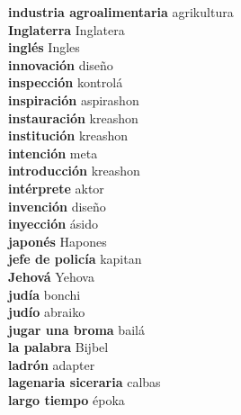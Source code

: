 \textbf{ industria agroalimentaria  } agrikultura \\
\textbf{ Inglaterra  } Inglatera \\
\textbf{ inglés  } Ingles \\
\textbf{ innovación  } diseño \\
\textbf{ inspección  } kontrolá \\
\textbf{ inspiración  } aspirashon \\
\textbf{ instauración  } kreashon \\
\textbf{ institución  } kreashon \\
\textbf{ intención  } meta \\
\textbf{ introducción  } kreashon \\
\textbf{ intérprete  } aktor \\
\textbf{ invención  } diseño \\
\textbf{ inyección  } ásido \\
\textbf{ japonés  } Hapones \\
\textbf{ jefe de policía  } kapitan \\
\textbf{ Jehová  } Yehova \\
\textbf{ judía  } bonchi \\
\textbf{ judío  } abraiko \\
\textbf{ jugar una broma  } bailá \\
\textbf{ la palabra  } Bijbel \\
\textbf{ ladrón  } adapter \\
\textbf{ lagenaria siceraria  } calbas \\
\textbf{ largo tiempo  } époka \\
